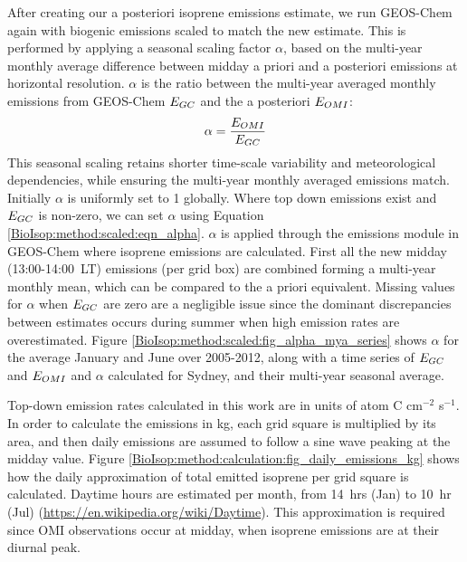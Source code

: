     After creating our a posteriori isoprene emissions estimate, we run GEOS-Chem again with biogenic emissions scaled to match the new estimate. 
    This is performed by applying a seasonal scaling factor $\alpha$, based on the multi-year monthly average difference between midday a priori and a posteriori emissions at \lowhr horizontal resolution.
    $\alpha$ is the ratio between the multi-year averaged monthly emissions from GEOS-Chem $E_{GC}$ and the a posteriori $E_{OMI}$: 
    \begin{equation} \label{BioIsop:method:scaled:eqn_alpha}
        \alpha = \frac{E_{OMI}}{E_{GC}}
    \end{equation}
    This seasonal scaling retains shorter time-scale variability and meteorological dependencies, while ensuring the multi-year monthly averaged emissions match.
    Initially $\alpha$ is uniformly set to 1 globally.
    Where top down emissions exist and $E_{GC}$ is non-zero, we can set $\alpha$ using Equation \ref{BioIsop:method:scaled:eqn_alpha}.
    $\alpha$ is applied through the emissions module in GEOS-Chem where isoprene emissions are calculated.
    First all the new midday (13:00-14:00~LT) emissions (per grid box) are combined forming a multi-year monthly mean, which can be compared to the a priori equivalent.
    Missing values for $\alpha$ when $E_{GC}$ are zero are a negligible issue since the dominant discrepancies between estimates occurs during summer when high emission rates are overestimated.
    Figure \ref{BioIsop:method:scaled:fig_alpha_mya_series} shows $\alpha$ for the average January and June over 2005-2012, along with a time series of $E_{GC}$ and $E_{OMI}$ and $\alpha$ calculated for Sydney, and their multi-year seasonal average.
    
    
    Top-down emission rates calculated in this work are in units of atom C cm$^{-2}$ s$^{-1}$.
    In order to calculate the emissions in kg, each grid square is multiplied by its area, and then daily emissions are assumed to follow a sine wave peaking at the midday value.
    Figure \ref{BioIsop:method:calculation:fig_daily_emissions_kg} shows how the daily approximation of total emitted isoprene per grid square is calculated.
    Daytime hours are estimated per month, from 14~hrs (Jan) to 10~hr (Jul) (\url{https://en.wikipedia.org/wiki/Daytime}).
    This approximation is required since OMI observations occur at midday, when isoprene emissions are at their diurnal peak.
    
